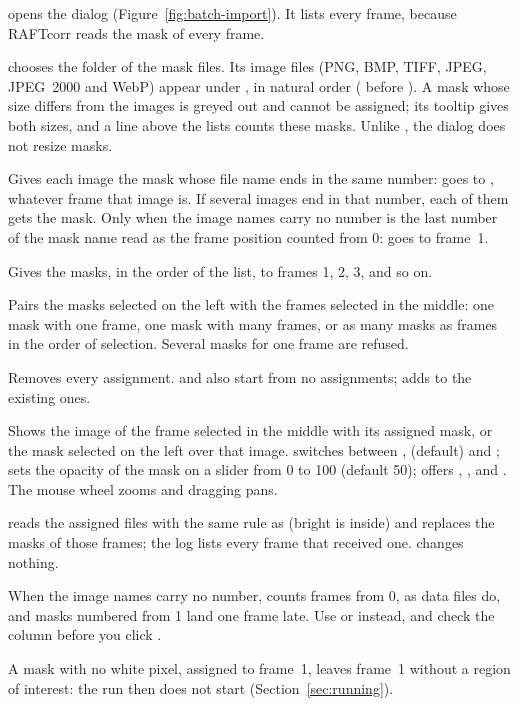  opens the  dialog
(Figure~\ref{fig:batch-import}). It lists every frame, because RAFTcorr reads the mask of every
frame.
\begin{description}[leftmargin=1.2cm,style=nextline]
  \item[Mask Folder]
     chooses the folder of the mask files. Its image files (PNG, BMP, TIFF, JPEG,
    JPEG~2000 and WebP) appear under , in natural order (
    before ). A mask whose size differs from the
    images is greyed out and cannot be assigned; its tooltip gives both sizes, and a line above
    the lists counts these masks. Unlike , the dialog does not resize masks.
  \item[Auto-Match by Name]
    Gives each image the mask whose file name ends in the same number:  goes to
    , whatever frame that image is. If several images end in that number, each
    of them gets the mask. Only when the image names carry no number is the last number of the
    mask name read as the frame position counted from 0:  goes to frame~1.
  \item[Assign Sequential]
    Gives the masks, in the order of the list, to frames 1, 2, 3, and so on.
  \item[Assign Selected ->]
    Pairs the masks selected on the left with the frames selected in the middle: one mask with
    one frame, one mask with many frames, or as many masks as frames in the order of selection.
    Several masks for one frame are refused.
  \item[Clear All]
    Removes every assignment.  and  also start
    from no assignments;  adds to the existing ones.
  \item[Preview]
    Shows the image of the frame selected in the middle with its assigned mask, or the mask
    selected on the left over that image.  switches between ,
     (default) and ;  sets the opacity of the mask
    on a slider from 0 to 100 (default 50);  offers , ,
     and . The mouse wheel zooms and dragging pans.
\end{description}
 reads the assigned files with the same rule as  (bright is inside) and
replaces the masks of those frames; the log lists every frame that received one. 
changes nothing.

\begin{warnbox}
When the image names carry no number,  counts frames from 0, as data
files do, and masks numbered from 1 land one frame late. Use  or
 instead, and check the  column before you click .
\end{warnbox}

A mask with no white pixel, assigned to frame~1, leaves frame~1 without a region of interest:
the run then does not start (Section~\ref{sec:running}).

